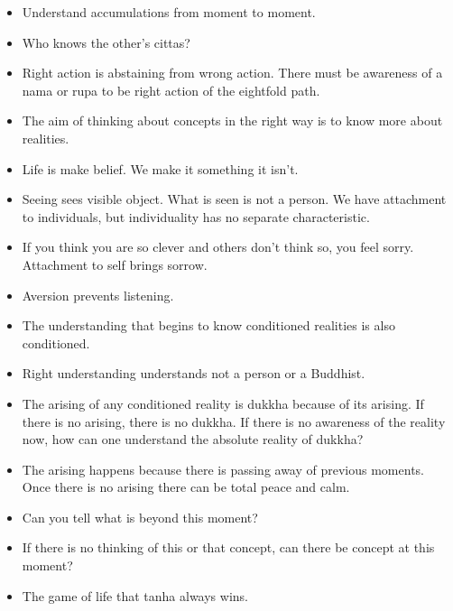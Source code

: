 \documentclass{article}
\begin{document}
\begin{itemize}
\item 
  Understand accumulations from moment to moment.

\item 
  Who knows the other's cittas?

\item 
  Right action is abstaining from wrong action. There must be
  awareness of a nama or rupa to be right action of the eightfold
  path.

\item 
  The aim of thinking about concepts in the right way is to know more
  about realities.

\item 
  Life is make belief. We make it something it isn't.

\item 
  Seeing sees visible object. What is seen is not a person. We have
  attachment to individuals, but individuality has no separate
  characteristic.

\item 
  If you think you are so clever and others don't think so, you feel
  sorry. Attachment to self brings sorrow.

\item 
  Aversion prevents listening.

\item 
  The understanding that begins to know conditioned realities is also
  conditioned.

\item 
  Right understanding understands not a person or a Buddhist.

\item 
  The arising of any conditioned reality is dukkha because of its
  arising. If there is no arising, there is no dukkha. If there is no
  awareness of the reality now, how can one understand the absolute
  reality of dukkha?

\item 
  The arising happens because there is passing away of previous
  moments. Once there is no arising there can be total peace and
  calm.

\item 
  Can you tell what is beyond this moment?

\item 
  If there is no thinking of this or that concept, can there be
  concept at this moment?

\item 
  The game of life that tanha always wins.


\end{itemize}
\end{document}
